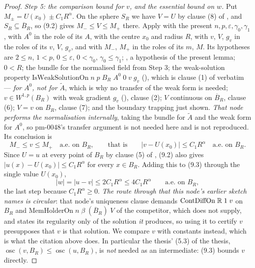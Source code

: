 \begin{proof}
\medskip
\noindent\emph{Step 5: the comparison bound for $v$, and the essential bound on
$w$.}  Put $M_\pm=U(x_0)\pm C_1R^{\alpha}$.  On the sphere $S_R$ we have
$V=U$ by clause (8) of , and $S_R\subseteq\overline
B_R$, so (9.2) gives $M_-\le V\le M_+$ there.  Apply
 with the present
$n,p,\varepsilon,\gamma_0,\gamma_1$, with $A^0$ in the role of its $A$, with the
centre $x_0$ and radius $R$, with $v$, $V$, $g_v$ in the roles of its $v$, $V$,
$g_v$, and with $M_-$, $M_+$ in the roles of its $m$, $M$.  Its hypotheses are
$2\le n$, $1<p$, $0\le\varepsilon$, $0<\gamma_0$, $\gamma_0\le\gamma_1$;
, a hypothesis of the present lemma; $0<R$;
the bundle for the normalised field from Step 3; the weak-solution property
$\mathrm{IsWeakSolutionOn}\;n\;p\;B_R\;A^0\;0\;v\;g_v$
(), which is clause (1) of
 verbatim --- \emph{for $A^0$, not for
$\widetilde A$}, which is why no transfer of the weak form is needed;
$v\in W^{1,p}(B_R)$ with weak gradient $g_v$ (), clause (2);
$V$ continuous on $\overline B_R$, clause (6); $V=v$ on $B_R$, clause (7); and
the boundary trapping just shown.  \emph{That node performs the normalisation
internally}, taking the bundle for $\widetilde A$ and the weak form for $A^0$,
so pm-0048's transfer argument is not needed here and is not reproduced.  Its
conclusion is
\[
M_-\le v\le M_+\quad\text{a.e. on }B_R,
\qquad\text{that is}\qquad
|v-U(x_0)|\le C_1R^{\alpha}\quad\text{a.e. on }B_R .
\tag{9.3}
\]
Since $U=u$ at every point of $B_R$ by clause (5) of
, (9.2) also gives
$|u(x)-U(x_0)|\le C_1R^{\alpha}$ for every $x\in B_R$.  Adding this to (9.3)
through the single value $U(x_0)$,
\[
|w|=|u-v|\le2C_1R^{\alpha}\le4C_1R^{\alpha}\qquad\text{a.e. on }B_R ,
\tag{9.4}
\]
the last step because $C_1R^{\alpha}\ge0$.  \emph{The route through
 that this node's earlier sketch names is
circular}: that node's uniqueness clause demands
$\mathrm{ContDiffOn}\;\mathbb{R}\;1\;v$ on $B_R$ and
$\mathrm{MemHolderOn}\;n\;\beta\;(\overline B_R)\;V$ of the competitor, which
 does not supply, and
 states its regularity only of the solution
\emph{it} produces, so using it to certify $v$ presupposes that $v$ is that
solution.  We compare $v$ with constants instead, which is what the citation
above does.  In particular the thesis' (5.3) of the thesis,
$\operatorname*{osc}(v,B_R)\le\operatorname*{osc}(u,B_R)$, is \emph{not} needed
as an intermediate: (9.3) bounds $v$ directly.


\end{proof}

